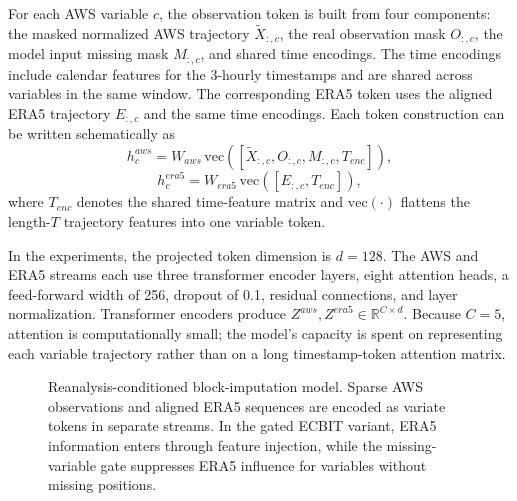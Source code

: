 For each AWS variable $c$, the observation token is built from four components: the masked normalized AWS trajectory $\tilde{X}_{:,c}$, the real observation mask $O_{:,c}$, the model input missing mask $M_{:,c}$, and shared time encodings. The time encodings include calendar features for the 3-hourly timestamps and are shared across variables in the same window. The corresponding ERA5 token uses the aligned ERA5 trajectory $E_{:,c}$ and the same time encodings. Each token construction can be written schematically as
\begin{equation}
h^{aws}_c = W_{aws}\,\mathrm{vec}([\tilde{X}_{:,c}, O_{:,c}, M_{:,c}, T_{enc}]),
\end{equation}
\begin{equation}
h^{era5}_c = W_{era5}\,\mathrm{vec}([E_{:,c}, T_{enc}]),
\end{equation}
where $T_{enc}$ denotes the shared time-feature matrix and $\mathrm{vec}(\cdot)$ flattens the length-$T$ trajectory features into one variable token.

In the experiments, the projected token dimension is $d=128$. The AWS and ERA5 streams each use three transformer encoder layers, eight attention heads, a feed-forward width of 256, dropout of 0.1, residual connections, and layer normalization. Transformer encoders produce $Z^{aws}, Z^{era5} \in \mathbb{R}^{C \times d}$. Because $C=5$, attention is computationally small; the model's capacity is spent on representing each variable trajectory rather than on a long timestamp-token attention matrix.

\begin{figure}[t]
  \centering
  \resizebox{0.98\textwidth}{!}{}
  \caption{Reanalysis-conditioned block-imputation model. Sparse AWS observations and aligned ERA5 sequences are encoded as variate tokens in separate streams. In the gated ECBIT variant, ERA5 information enters through feature injection, while the missing-variable gate suppresses ERA5 influence for variables without missing positions.}
  \label{fig:ecbit-arch}
\end{figure}

